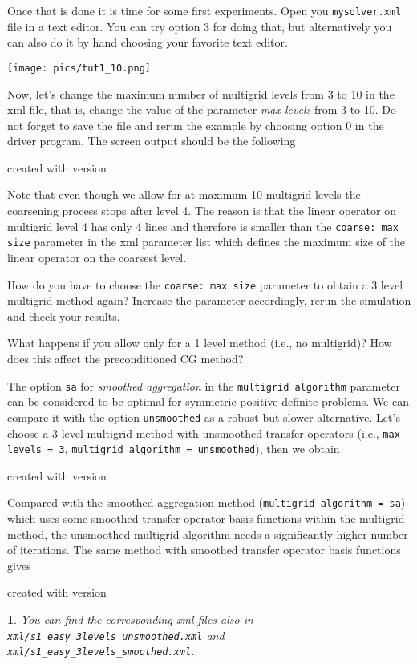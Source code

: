\documentclass[10pt,fleqn]{book}
\newtheorem*{mycomment}{\ding{42}}
\newcommand\printScreenOutput[1]{

{\vspace{-0.3cm}\hfill\tiny{created with \muelu version }}
}
\begin{document}
Once that is done it is time for some first experiments. Open you \texttt{mysolver.xml} file in a text editor. You can try option 3 for doing that, but alternatively you can also do it by hand choosing your favorite text editor.

\begin{center}\texttt{[image: pics/tut1\_10.png]} \end{center}

Now, let's change the maximum number of multigrid levels from 3 to 10 in the xml file, that is, change the value of the parameter \textit{max levels} from 3 to 10. Do not forget to save the file and rerun the example by choosing option 0 in the driver program.
The screen output should be the following

\printScreenOutput{s1_easy_10levels.txt_3.fragment_3.fragment}

Note that even though we allow for at maximum 10 multigrid levels the coarsening process stops after level 4. The reason is that the linear operator on multigrid level 4 has only 4 lines and therefore is smaller than the \texttt{coarse: max size} parameter in the xml parameter list which defines the maximum size of the linear operator on the coarsest level.


\begin{exercise}
How do you have to choose the \texttt{coarse: max size} parameter to obtain a 3 level multigrid method again? Increase the parameter accordingly, rerun the simulation and check your results.
\end{exercise}
\begin{exercise}
What happens if you allow only for a 1 level method (i.e., no multigrid)? How does this affect the preconditioned CG method?
\end{exercise}

The option \texttt{sa} for \textit{smoothed aggregation} in the \texttt{multigrid algorithm} parameter can be considered to be optimal for symmetric positive definite problems. We can compare it with the option \texttt{unsmoothed} as a robust but slower alternative. Let's choose a 3 level multigrid method with unsmoothed transfer operators (i.e., \texttt{max levels = 3}, \texttt{multigrid algorithm = unsmoothed}), then we obtain
\printScreenOutput{s1_easy_3levels_unsmoothed.txt_5.fragment}

Compared with the smoothed aggregation method (\texttt{multigrid algorithm = sa}) which uses some smoothed transfer operator basis functions within the multigrid method, the unsmoothed multigrid algorithm needs a significantly higher number of iterations.
The same method with smoothed transfer operator basis functions gives
\printScreenOutput{s1_easy_3levels_smoothed.txt_5.fragment}
\begin{mycomment}
You can find the corresponding xml files also in \texttt{xml/s1\_easy\_3levels\_unsmoothed.xml} and \texttt{xml/s1\_easy\_3levels\_smoothed.xml}.
\end{mycomment}
\end{document}
